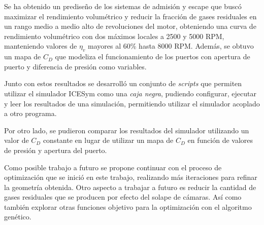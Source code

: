 Se ha obtenido un prediseño de los sistemas de admisión y escape que buscó
maximizar el rendimiento volumétrico y reducir la fracción de gases residuales
en un rango medio a medio alto de revoluciones del motor, obteniendo una curva
de rendimiento volumétrico con dos máximos locales a 2500 y 5000 RPM,
manteniendo valores de  $\eta_v$ mayores al 60\% hasta 8000 RPM.
%
Además, se obtuvo un mapa de $C_D$ que modeliza el funcionamiento de los
puertos con apertura de puerto y diferencia de presión como variables.

Junto con estos resultados se desarrolló un conjunto de \emph{scripts} que
permiten utilizar el simulador ICESym como una \emph{caja negra}, pudiendo
configurar, ejecutar y leer los resultados de una simulación, permitiendo
utilizar el simulador acoplado a otro programa.

Por otro lado, se pudieron comparar los resultados del simulador utilizando un valor
de $C_{D}$ constante en lugar de utilizar un mapa de $C_{D}$ en función de
valores de presión y apertura del puerto.

Como posible trabajo a futuro se propone continuar con el proceso de optimización
que se inició en este trabajo, realizando más iteraciones para refinar la
geometría obtenida.
%
Otro aspecto a trabajar a futuro es reducir la cantidad de gases residuales que
se producen por efecto del solape de cámaras.
%
Así como también explorar otras funciones objetivo para la optimización con el
algoritmo genético.
